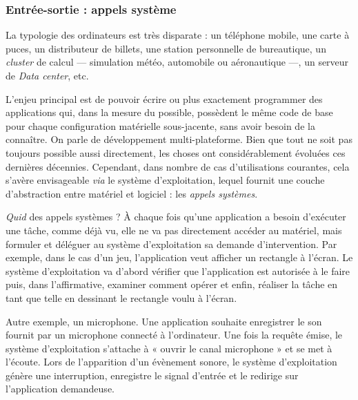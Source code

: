 \subsubsection[Appels système]{Entrée-sortie : appels système}
\label{subsub:I.2.1.3}

La typologie des ordinateurs est très disparate : un téléphone mobile, une carte à puces, un distributeur de billets, une station personnelle de bureautique, un \textit{cluster} de calcul --- simulation météo, automobile ou aéronautique ---, un serveur de \textit{Data center}, etc.

L'enjeu principal est de pouvoir écrire ou plus exactement programmer des applications qui, dans la mesure du possible, possèdent le même code de base pour chaque configuration matérielle sous-jacente, sans avoir besoin de la connaître. On parle de développement multi-plateforme. Bien que tout ne soit pas toujours possible aussi directement, les choses ont considérablement évoluées ces dernières décennies. Cependant, dans nombre de cas d'utilisations courantes, cela s'avère envisageable \textit{via} le système d'exploitation, lequel fournit une couche d'abstraction entre matériel et logiciel : les \emph{appels systèmes}.

\textit{Quid} des appels systèmes ? À chaque fois qu'une application a besoin d'exécuter une tâche, comme déjà vu, elle ne va pas directement accéder au matériel, mais formuler et déléguer au système d'exploitation sa demande d'intervention. Par exemple, dans le cas d'un jeu, l'application veut afficher un rectangle à l'écran. Le système d'exploitation va d'abord vérifier que l'application est autorisée à le faire puis, dans l'affirmative, examiner comment opérer et enfin, réaliser la tâche en tant que telle en dessinant le rectangle voulu à l'écran.

Autre exemple, un microphone. Une application souhaite enregistrer le son fournit par un microphone connecté à l'ordinateur. Une fois la requête émise, le système d'exploitation s'attache à « ouvrir le canal microphone » et se met à l'écoute. Lors de l'apparition d'un évènement sonore, le système d'exploitation génère une interruption, enregistre le signal d'entrée et le redirige sur l'application demandeuse.


